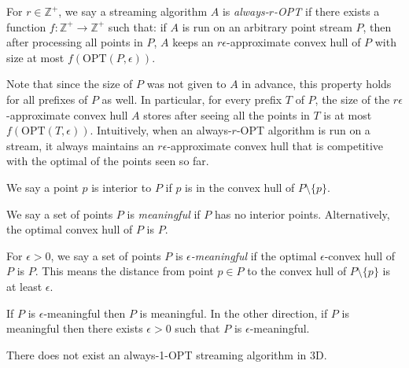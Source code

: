 \begin{definition}
For $r \in \mathbb{Z}^+$, we say a streaming algorithm $A$ is \emph{always-$r$-OPT} if there exists a function $f : \mathbb{Z}^+ \to \mathbb{Z}^+$ such that: if $A$ is run on an arbitrary point stream $P$, then after processing all points in $P$, $A$ keeps an $r\epsilon$-approximate convex hull of $P$ with size at most $f(\mbox{OPT}(P, \epsilon))$.
\end{definition}

Note that since the size of $P$ was not given to $A$ in advance, this property holds for all prefixes of $P$ as well. In particular, for every prefix $T$ of $P$, the size of the $r\epsilon$-approximate convex hull $A$ stores after seeing all the points in $T$ is at most $f(\mbox{OPT}(T, \epsilon))$. Intuitively, when an always-$r$-OPT algorithm is run on a stream, it always maintains an $r\epsilon$-approximate convex hull that is competitive with the optimal of the points seen so far.

\begin{definition}
We say a point $p$ is interior to $P$ if $p$ is in the convex hull of $P \setminus \{p\}$.
\end{definition}

\begin{definition}
We say a set of points $P$ is \emph{meaningful} if $P$ has no interior points. Alternatively, the optimal convex hull of $P$ is $P$.
\end{definition}

\begin{definition}
For $\epsilon > 0$, we say a set of points $P$ is \emph{$\epsilon$-meaningful} if the optimal $\epsilon$-convex hull of $P$ is $P$. This means the distance from point $p \in P$ to the convex hull of $P \setminus \{p\}$ is at least $\epsilon$.
\end{definition}

\begin{lemma}
If $P$ is $\epsilon$-meaningful then $P$ is meaningful. In the other direction, if $P$ is meaningful then there exists $\epsilon > 0$ such that $P$ is $\epsilon$-meaningful.
\end{lemma}

\begin{theorem}
There does not exist an always-1-OPT streaming algorithm in 3D.
\label{thm:alwaysopt}
\end{theorem}

